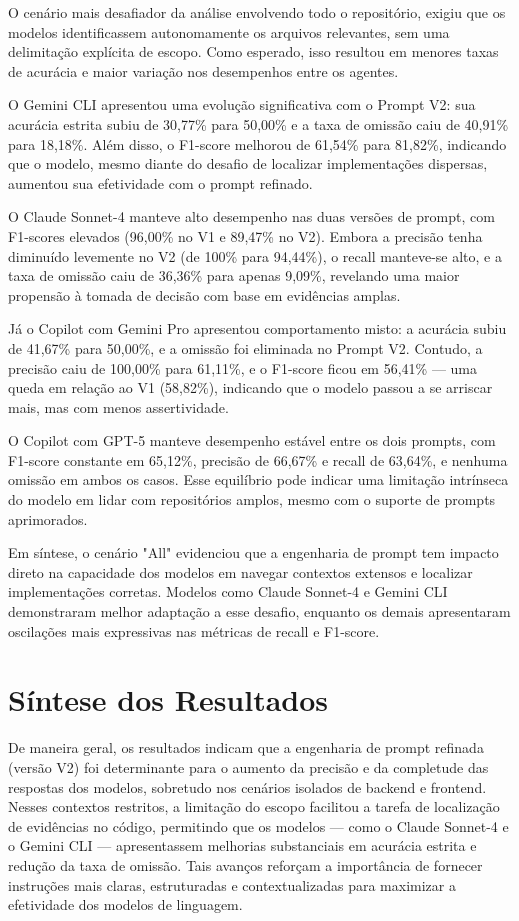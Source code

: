 O cenário mais desafiador da análise envolvendo todo o repositório, exigiu que os modelos identificassem autonomamente os arquivos relevantes, sem uma delimitação explícita de escopo. Como esperado, isso resultou em menores taxas de acurácia e maior variação nos desempenhos entre os agentes.

O Gemini CLI apresentou uma evolução significativa com o Prompt V2: sua acurácia estrita subiu de 30,77\% para 50,00\% e a taxa de omissão caiu de 40,91\% para 18,18\%. Além disso, o F1-score melhorou de 61,54\% para 81,82\%, indicando que o modelo, mesmo diante do desafio de localizar implementações dispersas, aumentou sua efetividade com o prompt refinado.

O Claude Sonnet-4 manteve alto desempenho nas duas versões de prompt, com F1-scores elevados (96,00\% no V1 e 89,47\% no V2). Embora a precisão tenha diminuído levemente no V2 (de 100\% para 94,44\%), o recall manteve-se alto, e a taxa de omissão caiu de 36,36\% para apenas 9,09\%, revelando uma maior propensão à tomada de decisão com base em evidências amplas.

Já o Copilot com Gemini Pro apresentou comportamento misto: a acurácia subiu de 41,67\% para 50,00\%, e a omissão foi eliminada no Prompt V2. Contudo, a precisão caiu de 100,00\% para 61,11\%, e o F1-score ficou em 56,41\% — uma queda em relação ao V1 (58,82\%), indicando que o modelo passou a se arriscar mais, mas com menos assertividade.

O Copilot com GPT-5 manteve desempenho estável entre os dois prompts, com F1-score constante em 65,12\%, precisão de 66,67\% e recall de 63,64\%, e nenhuma omissão em ambos os casos. Esse equilíbrio pode indicar uma limitação intrínseca do modelo em lidar com repositórios amplos, mesmo com o suporte de prompts aprimorados.

Em síntese, o cenário "All" evidenciou que a engenharia de prompt tem impacto direto na capacidade dos modelos em navegar contextos extensos e localizar implementações corretas. Modelos como Claude Sonnet-4 e Gemini CLI demonstraram melhor adaptação a esse desafio, enquanto os demais apresentaram oscilações mais expressivas nas métricas de recall e F1-score.

\section{Síntese dos Resultados}

De maneira geral, os resultados indicam que a engenharia de prompt refinada (versão V2) foi determinante para o aumento da precisão e da completude das respostas dos modelos, sobretudo nos cenários isolados de backend e frontend. Nesses contextos restritos, a limitação do escopo facilitou a tarefa de localização de evidências no código, permitindo que os modelos — como o Claude Sonnet-4 e o Gemini CLI — apresentassem melhorias substanciais em acurácia estrita e redução da taxa de omissão. Tais avanços reforçam a importância de fornecer instruções mais claras, estruturadas e contextualizadas para maximizar a efetividade dos modelos de linguagem.


